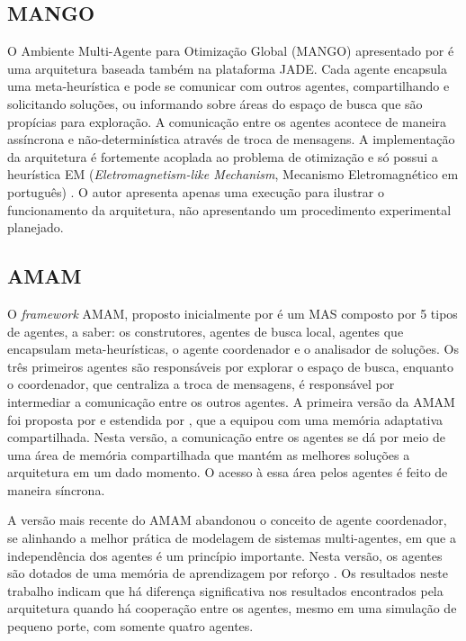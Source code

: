 \subsection{MANGO}
O Ambiente Multi-Agente para Otimização Global (MANGO) apresentado por  é uma arquitetura baseada também na plataforma JADE. Cada agente encapsula uma meta-heurística e pode se comunicar com outros agentes, compartilhando e solicitando soluções, ou informando sobre áreas do espaço de busca que são propícias para exploração. A comunicação entre os agentes acontece de maneira assíncrona e não-determinística através de troca de mensagens. A implementação da arquitetura é fortemente acoplada ao problema de otimização e só possui a heurística EM (\textit{Eletromagnetism-like Mechanism}, Mecanismo Eletromagnético em português) \cite{birbil2003}. O autor apresenta apenas uma execução para ilustrar o funcionamento da arquitetura, não apresentando um procedimento experimental planejado.


\subsection{AMAM}
O \textit{framework} AMAM, proposto inicialmente por  é um MAS composto por 5 tipos de agentes, a saber: os construtores, agentes de busca local, agentes que encapsulam meta-heurísticas, o agente coordenador e o analisador de soluções. Os três primeiros agentes são responsáveis por explorar o espaço de busca, enquanto o coordenador, que centraliza a troca de mensagens, é responsável por intermediar a comunicação entre os outros agentes. A primeira versão da AMAM foi proposta por  e estendida por , que a equipou com uma memória adaptativa compartilhada. Nesta versão, a comunicação entre os agentes se dá por meio de uma área de memória compartilhada que mantém as melhores soluções a arquitetura em um dado momento. O acesso à essa área pelos agentes é feito de maneira síncrona.  

A versão mais recente do AMAM abandonou o conceito de agente coordenador, se alinhando a melhor prática de modelagem de sistemas multi-agentes, em que a independência dos agentes é um princípio importante. Nesta versão, os agentes são dotados de uma memória de aprendizagem por reforço \cite{silva2015}. Os resultados neste trabalho indicam que há diferença significativa nos resultados encontrados pela arquitetura quando há  cooperação entre os agentes, mesmo em uma simulação de pequeno porte, com somente quatro agentes.

